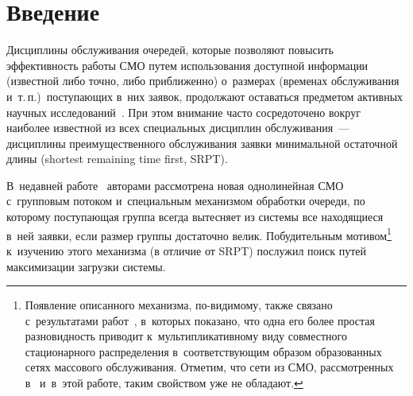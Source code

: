 
 
\vspace*{2pt}



\thispagestyle{headings}

\begin{multicols}{2}

\label{st\stat}


\section{Введение}

\vspace*{-5pt}

Дисциплины обслуживания очередей, которые позволяют
повысить эффективность работы %
СМО
путем использования доступной информации (известной либо точно, либо 
приближенно)
о~размерах (временах обслуживания и~т.\,п.)\
поступающих в~них заявок, продолжают оставаться предметом активных
научных исследований~\cite{i2, i3, i4, i5, i6}.
При этом внимание часто сосредоточено вокруг наиболее известной
из всех специальных дисциплин обслуживания~---
дисциплины преимущественного обслуживания заявки минимальной
остаточной длины (shortest remaining time first, SRPT).

В~недавней работе~\cite{i1} авторами рассмотрена новая однолинейная СМО 
с~групповым потоком и~специальным механизмом обработки очереди,
по которому поступающая группа всегда вытесняет из системы
все находящиеся в~ней заявки, если размер группы достаточно велик.
Побудительным мотивом\footnote[3]{Появление описанного механизма, по-видимому,
также связано с~результатами работ~\cite{i7,i8}, в~которых показано, что
одна его более простая разновидность приводит к~мультипликативному виду
совместного стационарного распределения в~соответствующим образом
образованных сетях массового обслуживания. Отметим, что сети из СМО, 
рассмотренных
в~\cite{i1} и~в~этой работе, таким свойством уже не обладают.}
к~изучению этого механизма (в отличие от SRPT) послужил
поиск путей максимизации загрузки системы.


\end{multicols}
